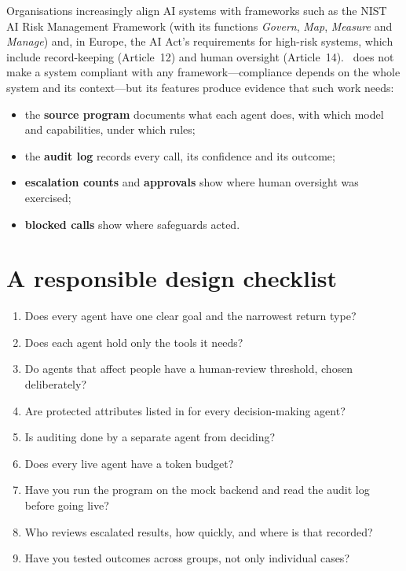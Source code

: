 Organisations increasingly align AI systems with frameworks such as the NIST AI Risk Management Framework (with its functions \emph{Govern}, \emph{Map}, \emph{Measure} and \emph{Manage}) and, in Europe, the AI Act's requirements for high-risk systems, which include record-keeping (Article~12) and human oversight (Article~14). \algolang\ does not make a system compliant with any framework---compliance depends on the whole system and its context---but its features produce evidence that such work needs:

\begin{itemize}
  \item the \textbf{source program} documents what each agent does, with which model and capabilities, under which rules;
  \item the \textbf{audit log} records every call, its confidence and its outcome;
  \item \textbf{escalation counts} and \textbf{approvals} show where human oversight was exercised;
  \item \textbf{blocked calls} show where safeguards acted.
\end{itemize}

\section{A responsible design checklist}

\begin{enumerate}
  \item Does every agent have one clear goal and the narrowest return type?
  \item Does each agent hold only the tools it needs?
  \item Do agents that affect people have a human-review threshold, chosen deliberately?
  \item Are protected attributes listed in  for every decision-making agent?
  \item Is auditing done by a separate agent from deciding?
  \item Does every live agent have a token budget?
  \item Have you run the program on the mock backend and read the audit log before going live?
  \item Who reviews escalated results, how quickly, and where is that recorded?
  \item Have you tested outcomes across groups, not only individual cases?
\end{enumerate}

